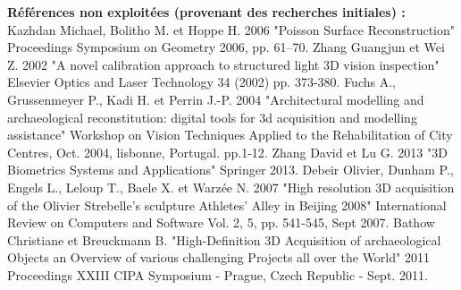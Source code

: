 \documentclass[a4paper,10pt]{report}
\begin{document}
\begin{thebibliography}{1}
\textbf{Références non exploitées (provenant des recherches initiales) :}
 Kazhdan Michael, Bolitho M. et Hoppe H. 2006 "Poisson Surface Reconstruction" Proceedings Symposium on Geometry 2006, pp. 61–70.
 Zhang Guangjun et Wei Z. 2002 "A novel calibration approach to structured light 3D vision inspection" Elsevier Optics and Laser Technology 34 (2002) pp. 373-380.
 Fuchs A., Grussenmeyer P., Kadi H. et Perrin J.-P. 2004 "Architectural modelling and archaeological reconstitution: digital tools for 3d acquisition and modelling assistance" Workshop on Vision Techniques Applied to the Rehabilitation of City Centres, Oct. 2004, lisbonne, Portugal. pp.1-12.
 Zhang David et Lu G. 2013 "3D Biometrics Systems and Applications" Springer 2013.
 Debeir Olivier, Dunham P., Engels L., Leloup T., Baele X. et Warzée N. 2007 "High resolution 3D acquisition of the Olivier Strebelle's sculpture Athletes' Alley in Beijing 2008" International Review on Computers and Software Vol. 2, 5, pp. 541-545, Sept 2007.
 Bathow Christiane et Breuckmann B. "High-Definition 3D Acquisition of archaeological Objects an Overview of various challenging Projects all over the World" 2011 Proceedings XXIII CIPA Symposium - Prague, Czech Republic - Sept. 2011.

\end{thebibliography}
\end{document}
